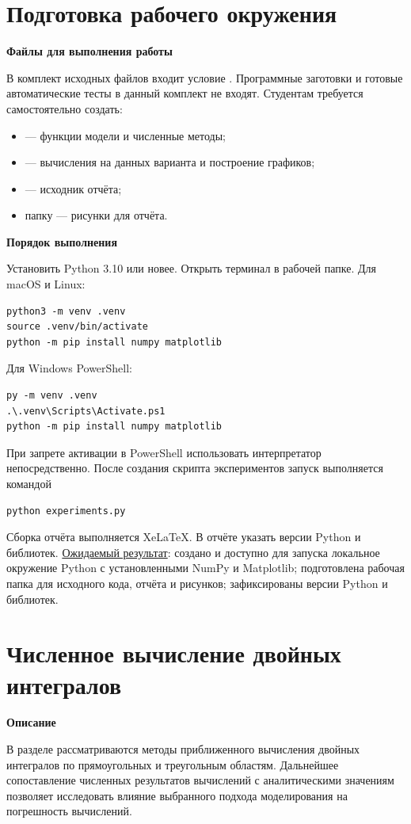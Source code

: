\documentclass[12pt,a4paper]{article}
\newcommand{\taskhead}[1]{\par\textbf{#1}\par}
\begin{document}
\section{Подготовка рабочего окружения}
\taskhead{Файлы для выполнения работы}
В комплект исходных файлов входит условие . Программные заготовки и готовые
автоматические тесты в данный комплект не входят.
Студентам требуется самостоятельно создать:
\begin{itemize}
\item {} --- функции модели и численные методы;
\item {} --- вычисления на данных варианта и построение графиков;
\item {} --- исходник отчёта;
\item папку  --- рисунки для отчёта.
\end{itemize}
\taskhead{Порядок выполнения}
Установить Python 3.10 или новее. Открыть терминал в рабочей папке.
Для macOS и Linux:
\begin{lstlisting}[style=commands]
python3 -m venv .venv
source .venv/bin/activate
python -m pip install numpy matplotlib
\end{lstlisting}
Для Windows PowerShell:
\begin{lstlisting}[style=commands]
py -m venv .venv
.\.venv\Scripts\Activate.ps1
python -m pip install numpy matplotlib
\end{lstlisting}
При запрете активации в PowerShell использовать интерпретатор
 непосредственно.
После создания скрипта экспериментов запуск выполняется командой
\begin{lstlisting}[style=commands]
python experiments.py
\end{lstlisting}
Сборка отчёта выполняется XeLaTeX. В отчёте указать версии Python и библиотек.
\underline{Ожидаемый результат}: создано и доступно для запуска локальное
окружение Python с установленными NumPy и Matplotlib; подготовлена рабочая
папка для исходного кода, отчёта и рисунков; зафиксированы версии Python
и библиотек.

\newpage

\section{Численное вычисление двойных интегралов}
\taskhead{Описание}

В разделе рассматриваются методы приближенного вычисления двойных интегралов 
по прямоугольных и треугольным областям. Дальнейшее сопоставление численных 
результатов вычислений с аналитическими значениям позволяет исследовать влияние выбранного 
подхода моделирования на погрешность вычислений.
\end{document}
